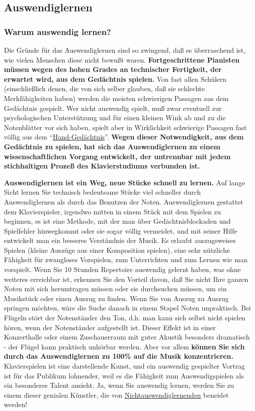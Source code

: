 
\subsection{Auswendiglernen}
\label{c1iii6} 

\subsubsection{Warum auswendig lernen?}
\label{c1iii6a}

Die Gründe für das Auswendiglernen sind so zwingend, daß es überraschend ist, wie vielen Menschen diese nicht bewußt waren.
\textbf{Fortgeschrittene Pianisten müssen wegen des hohen Grades an technischer Fertigkeit, der erwartet wird, aus dem Gedächtnis spielen.}
Von fast allen Schülern (einschließlich denen, die von sich selber glauben, daß sie schlechte Merkfähigkeiten haben) werden die meisten schwierigen Passagen aus dem Gedächtnis gespielt.
Wer nicht auswendig spielt, muß zwar eventuell zur psychologischen Unterstützung und für einen kleinen Wink ab und zu die Notenblätter vor sich haben, spielt aber in Wirklichkeit schwierige Passagen fast völlig aus dem \enquote{\hyperref[c1iii6d]{Hand-Gedächtnis}}.
\textbf{Wegen dieser Notwendigkeit, aus dem Gedächtnis zu spielen, hat sich das Auswendiglernen zu einem wissenschaftlichen Vorgang entwickelt, der untrennbar mit jedem stichhaltigen Prozeß des Klavierstudiums verbunden ist.}

\textbf{Auswendiglernen ist ein Weg, neue Stücke schnell zu lernen.}
Auf lange Sicht lernen Sie technisch bedeutsame Stücke viel schneller durch Auswendiglernen als durch das Benutzen der Noten.
Auswendiglernen gestattet dem Klavierspieler, irgendwo mitten in einem Stück mit dem Spielen zu beginnen, es ist eine Methode, mit der man über Gedächtnisblockaden und Spielfehler hinwegkommt oder sie sogar völlig vermeidet, und  mit seiner Hilfe entwickelt man ein besseres Verständnis der Musik.
Es erlaubt auszugsweises Spielen (kleine Auszüge aus einer Komposition spielen), eine sehr nützliche Fähigkeit für zwangloses Vorspielen, zum Unterrichten und zum Lernen wie man vorspielt.
Wenn Sie 10 Stunden Repertoire auswendig gelernt haben, was ohne weiteres erreichbar ist, erkennen Sie den Vorteil davon, daß Sie nicht Ihre ganzen Noten mit sich herumtragen müssen oder sie durchsuchen müssen, um ein Musikstück oder einen Auszug zu finden.
Wenn Sie von Auszug zu Auszug springen möchten, wäre die Suche danach in einem Stapel Noten unpraktisch.
Bei Flügeln stört der Notenständer den Ton, d.h. man kann sich selbst nicht spielen hören, wenn der Notenständer aufgestellt ist.
Dieser Effekt ist in einer Konzerthalle oder einem Zuschauerraum mit guter Akustik besonders dramatisch - der Flügel kann praktisch unhörbar werden.
Aber vor allem \textbf{können Sie sich durch das Auswendiglernen zu 100\% auf die Musik konzentrieren.}
Klavierspielen ist eine darstellende Kunst, und ein auswendig gespielter Vortrag ist für das Publikum lohnender, weil es die Fähigkeit zum Auswendigspielen als ein besonderes Talent ansieht.
Ja, wenn Sie auswendig lernen, werden Sie zu einem dieser genialen Künstler, die von \hyperref[memorizer]{Nichtauswendiglernenden} beneidet werden!

